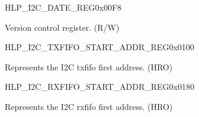 \begin{register}{H}{LP\_I2C\_DATE\_REG}{0x00F8}\label{regdesc:LPI2CDATEREG}
%
\regnewline%
\begin{regdesc}\begin{reglist}
\label{fielddesc:LPI2CDATE}\item [LP\_I2C\_DATE] Version control register. (R/W)
\end{reglist}\end{regdesc}
\end{register}


\begin{register}{H}{LP\_I2C\_TXFIFO\_START\_ADDR\_REG}{0x0100}\label{regdesc:LPI2CTXFIFOSTARTADDRREG}
%
\regnewline%
\begin{regdesc}\begin{reglist}
\label{fielddesc:LPI2CTXFIFOSTARTADDR}\item [LP\_I2C\_TXFIFO\_START\_ADDR] Represents the I2C txfifo first address. (HRO)
\end{reglist}\end{regdesc}
\end{register}


\begin{register}{H}{LP\_I2C\_RXFIFO\_START\_ADDR\_REG}{0x0180}\label{regdesc:LPI2CRXFIFOSTARTADDRREG}
%
\regnewline%
\begin{regdesc}\begin{reglist}
\label{fielddesc:LPI2CRXFIFOSTARTADDR}\item [LP\_I2C\_RXFIFO\_START\_ADDR] Represents the I2C rxfifo first address. (HRO)
\end{reglist}\end{regdesc}
\end{register}
